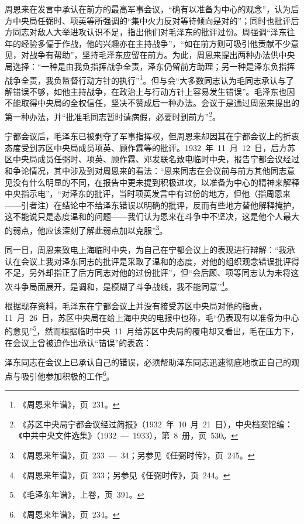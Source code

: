 周恩来在发言中承认在前方的最高军事会议，“确有以准备为中心的观念”，认为后方中央局任弼时、项英等所强调的“集中火力反对等待倾向是对的”；同时也批评后方同志对敌人大举进攻认识不足，指出他们对毛泽东的批评过份。周强调“泽东往年的经验多偏于作战，他的兴趣亦在主持战争”，“如在前方则可吸引他贡献不少意见，对战争有帮助”，坚持毛泽东应留在前方。为此，周恩来提出两种办法供中央局选择：“一种是由我负指挥战争全责，泽东仍留前方助理；另一种是泽东负指挥战争全责，我负监督行动方针的执行”\footnote{《周恩来年谱》，页~231。}。但与会“大多数同志认为毛同志承认与了解错误不够，如他主持战争，在政治上与行动方针上容易发生错误”。毛泽东也因不能取得中央局的全权信任，坚决不赞成后一种办法。会议于是通过周恩来提出的第一种办法，并“批准毛同志暂时请病假，必要时到前方”\footnote{《苏区中央局宁都会议经过简报》（1932~年~10~月~21~日），中央档案馆编：《中共中央文件选集》（1932~—~1933），第~8~册，页~530。}。

宁都会议后，毛泽东已被剥夺了军事指挥权，但周恩来却因其在宁都会议上的折衷态度受到苏区中央局成员项英、顾作霖等的批评。1932~年~11~月~12~日，后方苏区中央局成员任弼时、项英、顾作霖、邓发联名致电临时中央，报告宁都会议经过和争论情况，其中涉及到对周恩来的看法：“恩来同志在会议前与前方其他同志意见没有什么明显的不同，在报告中更未提到积极进攻，以准备为中心的精神来解释中央指示电”，“对泽东的批评，当时项英发言中有过份的地方，但他（指周恩来——引者注）在结论中不给泽东错误以明确的批评，反而有些地方替他解释掩护，这不能说只是态度温和的问题——我们认为恩来在斗争中不坚决，这是他个人最大的弱点，他应该深刻了解此弱点加以克服”\footnote{《周恩来年谱》，页~233~—~34；另参见《任弼时传》，页~245。}。

同一日，周恩来致电上海临时中央，为自己在宁都会议上的表现进行辩解：“我承认在会议上我对泽东同志的批评是采取了温和的态度，对他的组织观念错误批评得不足，另外却指正了后方同志对他的过份批评”，但“会后顾、项等同志认为未将这次斗争局面展开，是调和，是模糊了斗争战线，我不能同意”\footnote{《周恩来年谱》，页~233；另参见《任弼时传》，页~244。}。

根据现存资料，毛泽东在宁都会议上并没有接受苏区中央局对他的指责，11~月~26~日，苏区中央局在给上海中央的电报中也称，毛“仍表现有以准备为中心的意见”\footnote{《毛泽东年谱》，上卷，页~391。}，然而根据临时中央~11~月给苏区中央局的覆电却又看出，毛在压力下，在会议上曾被迫作出承认“错误”的表态：

\begin{quoting}
泽东同志在会议上已承认自己的错误，必须帮助泽东同志迅速彻底地改正自己的观点与吸引他参加积极的工作\footnote{《周恩来年谱》，页~234。}。
\end{quoting}

